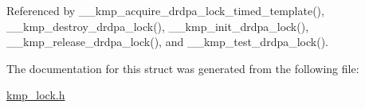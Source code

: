 Referenced by \-\_\-\-\_\-kmp\-\_\-acquire\-\_\-drdpa\-\_\-lock\-\_\-timed\-\_\-template(), \-\_\-\-\_\-kmp\-\_\-destroy\-\_\-drdpa\-\_\-lock(), \-\_\-\-\_\-kmp\-\_\-init\-\_\-drdpa\-\_\-lock(), \-\_\-\-\_\-kmp\-\_\-release\-\_\-drdpa\-\_\-lock(), and \-\_\-\-\_\-kmp\-\_\-test\-\_\-drdpa\-\_\-lock().



The documentation for this struct was generated from the following file\-:\begin{DoxyCompactItemize}
\item 
\hyperlink{kmp__lock_8h}{kmp\-\_\-lock.\-h}\end{DoxyCompactItemize}
